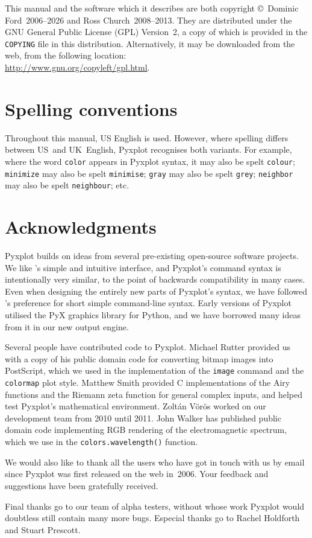 This manual and the software which it describes are both copyright \copyright\
Dominic Ford~2006--2026 and Ross Church~2008--2013. They are distributed under
the GNU General Public License (GPL) Version~2, a copy of which is provided in
the {\tt COPYING} file in this distribution.\index{General Public
License}\index{license} Alternatively, it may be downloaded from the web, from
the following location:\\ \url{http://www.gnu.org/copyleft/gpl.html}.

\section{Spelling conventions}

Throughout this manual, US English is used. However, where spelling differs
between US~and UK~English, Pyxplot recognises both variants. For example, where
the word \texttt{color} appears in Pyxplot syntax, it may also be spelt
\texttt{colour}; \texttt{minimize} may also be spelt \texttt{minimise};
\texttt{gray} may also be spelt \texttt{grey}; \texttt{neighbor} may also be
spelt \texttt{neighbour}; etc.

\section{Acknowledgments}

Pyxplot builds on ideas from several pre-existing open-source software
projects. We like \gnuplot's simple and intuitive interface, and Pyxplot's
command syntax is intentionally very similar, to the point of backwards
compatibility in many cases. Even when designing the entirely new parts of
Pyxplot's syntax, we have followed \gnuplot's preference for short simple
command-line syntax.  Early versions of Pyxplot utilised the PyX
graphics library for Python, and we have borrowed many ideas from it in our new
output engine.

Several people have contributed code to Pyxplot. Michael Rutter provided us 
with a copy of his public domain code for converting bitmap images into
PostScript, which we used in the implementation of the {\tt image} command and
the {\tt colormap} plot style. Matthew Smith provided C implementations of the
Airy functions and the Riemann zeta function for general complex inputs, and
helped test Pyxplot's mathematical environment. Zolt\'an V\"or\"os worked on
our development team from 2010 until 2011.  John Walker has published public
domain code implementing RGB rendering of the electromagnetic spectrum, which
we use in the {\tt colors.\-wave\-length()} function.

We would also like to thank all the users who have got in touch with us by
email since Pyxplot was first released on the web in~2006. Your feedback and
suggestions have been gratefully received.

Final thanks go to our team of alpha testers, without whose work Pyxplot would
doubtless still contain many more bugs.  Especial thanks go to Rachel Holdforth
and Stuart Prescott.

